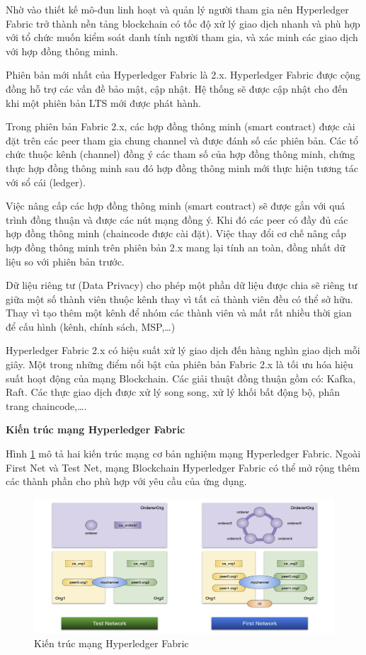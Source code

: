 Nhờ vào thiết kế mô-đun linh hoạt và quản lý người tham gia nên Hyperledger Fabric trở thành nền tảng blockchain có tốc độ xử lý giao dịch nhanh và phù hợp với tổ chức muốn kiểm soát danh tính người tham gia, và xác minh các giao dịch với hợp đồng thông minh.

Phiên bản mới nhất của Hyperledger Fabric là 2.x. Hyperledger Fabric được cộng đồng hỗ trợ các vấn đề bảo mật, cập nhật. Hệ thống sẽ được cập nhật cho đến khi một phiên bản LTS mới được phát hành.

Trong phiên bản Fabric 2.x, các hợp đồng thông minh (smart contract) được cài đặt trên các peer tham gia chung channel và được đánh số các phiên bản. Các tổ chức thuộc kênh (channel) đồng ý các tham số của hợp đồng thông minh, chứng thực hợp đồng thông minh sau đó hợp đồng thông minh mới thực hiện tương tác với sổ cái (ledger).

Việc nâng cấp các hợp đồng thông minh (smart contract) sẽ được gắn với quá trình đồng thuận và được các nút mạng đồng ý. Khi đó các peer có đầy đủ các hợp đồng thông minh (chaincode được cài đặt). Việc thay đổi cơ chế nâng cấp hợp đồng thông minh trên phiên bản 2.x mang lại tính an toàn, đồng nhất dữ liệu so với phiên bản trước.

Dữ liệu riêng tư (Data Privacy) cho phép một phần dữ liệu được chia sẽ riêng tư giữa một số thành viên thuộc kênh thay vì tất cả thành viên đều có thể sở hữu. Thay vì tạo thêm một kênh để nhóm các thành viên và mất rất nhiều thời gian để cấu hình (kênh, chính sách, MSP,…) 

Hyperledger Fabric 2.x có hiệu suất xử lý giao dịch đến hàng nghìn giao dịch mỗi giây. Một trong những điểm nổi bật của phiên bản Fabric 2.x là tối ưu hóa hiệu suất hoạt động của mạng Blockchain. Các giải thuật đồng thuận gồm có: Kafka, Raft. Các thực giao dịch được xử lý song song, xử lý khối bất động bộ, phân trang chaincode,\ldots.

\textbf{Kiến trúc mạng Hyperledger Fabric}

Hình \ref{fig:hlf_network} mô tả hai kiến trúc mạng cơ bản nghiệm mạng Hyperledger Fabric. Ngoài First Net và Test Net, mạng Blockchain Hyperledger Fabric có thể mở rộng thêm các thành phần cho phù hợp với yêu cầu của ứng dụng. 

\begin{figure}[htbp]
\centering
\includegraphics[width=.9\linewidth]{img/hlf_network.png}
\caption{Kiến trúc mạng Hyperledger Fabric}
\label{fig:hlf_network}
\end{figure}

